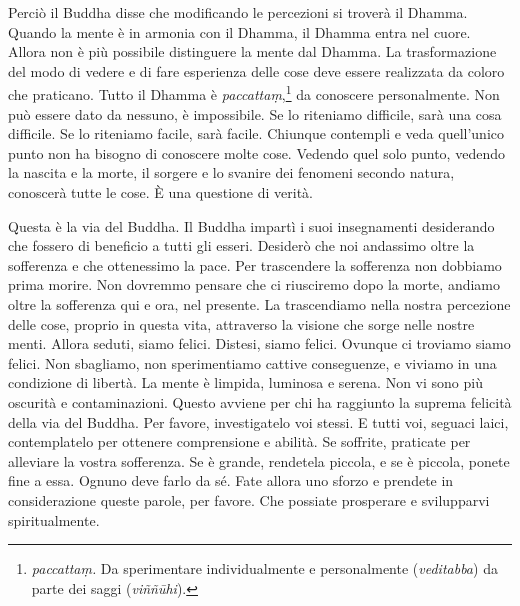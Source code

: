 Perciò il Buddha disse che modificando le percezioni si troverà il
Dhamma. Quando la mente è in armonia con il Dhamma, il Dhamma entra nel
cuore. Allora non è più possibile distinguere la mente dal Dhamma. La
trasformazione del modo di vedere e di fare esperienza delle cose deve
essere realizzata da coloro che praticano. Tutto il Dhamma è
\emph{paccattaṃ},\footnote{\emph{paccattaṃ.} Da sperimentare
  individualmente e personalmente (\emph{veditabba}) da parte dei saggi
  (\emph{viññūhi}).} da conoscere personalmente. Non può essere dato da
nessuno, è impossibile. Se lo riteniamo difficile, sarà una cosa
difficile. Se lo riteniamo facile, sarà facile. Chiunque contempli e
veda quell'unico punto non ha bisogno di conoscere molte cose. Vedendo
quel solo punto, vedendo la nascita e la morte, il sorgere e lo svanire
dei fenomeni secondo natura, conoscerà tutte le cose. È una questione di
verità.

Questa è la via del Buddha. Il Buddha impartì i suoi insegnamenti
desiderando che fossero di beneficio a tutti gli esseri. Desiderò che
noi andassimo oltre la sofferenza e che ottenessimo la pace. Per
trascendere la sofferenza non dobbiamo prima morire. Non dovremmo
pensare che ci riusciremo dopo la morte, andiamo oltre la sofferenza qui
e ora, nel presente. La trascendiamo nella nostra percezione delle cose,
proprio in questa vita, attraverso la visione che sorge nelle nostre
menti. Allora seduti, siamo felici. Distesi, siamo felici. Ovunque ci
troviamo siamo felici. Non sbagliamo, non sperimentiamo cattive
conseguenze, e viviamo in una condizione di libertà. La mente è limpida,
luminosa e serena. Non vi sono più oscurità e contaminazioni. Questo
avviene per chi ha raggiunto la suprema felicità della via del Buddha.
Per favore, investigatelo voi stessi. E tutti voi, seguaci laici,
contemplatelo per ottenere comprensione e abilità. Se soffrite,
praticate per alleviare la vostra sofferenza. Se è grande, rendetela
piccola, e se è piccola, ponete fine a essa. Ognuno deve farlo da sé.
Fate allora uno sforzo e prendete in considerazione queste parole, per
favore. Che possiate prosperare e svilupparvi spiritualmente.

